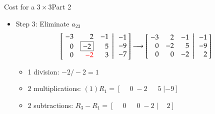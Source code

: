 \documentclass[10pt]{beamer}
\begin{document}
\begin{frame}{Cost for a $3\times 3$}{Part 2}
\begin{itemize}
\item Step 3: Eliminate $a_{23}$
$$
    \left[\left.\negthickspace\begin{array}{rrr}  -3 &  2 & -1 \\
                                                0 & \boxed{-2} &  5 \\
                                                0 & \textcolor{red}{-2} &  3 \end{array}
       \right|\begin{array}{r} -1 \\ -9 \\ -7 \end{array}\negthickspace\right]
        \longrightarrow
        \left[\left.\negthickspace\begin{array}{rrr}  -3 &  2 & -1 \\
                                                0 & -2 &  5 \\
                                                0 &  0 & -2 \end{array}
       \right|\begin{array}{r} -1 \\ -9 \\ 2 \end{array}\negthickspace\right]
$$
\begin{itemize}
    \item 1 division: $-2/-2 = 1$
    \item 2 multiplications: $ (1)R_1 = [\phantom{-}0\; -2\; \phantom{-}5\; | -9]$
    \item 2 subtractions: $R_3 - R_1 = [\phantom{-}0\; \phantom{-}0\; -2\; | \phantom{-}2]$ 
\end{itemize}
\end{itemize}
\end{frame}
\end{document}
